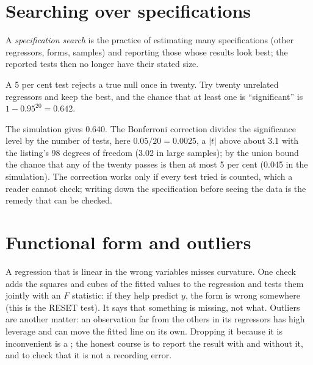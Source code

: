 \section{Searching over specifications}\label{sec:b2:specification:search}

\begin{definition}\label{def:b2:specification:spec-search}
A \emph{specification search} is the practice of estimating many specifications (other
regressors, forms, samples) and reporting those whose results look best; the reported tests then no longer have their
stated size.
\end{definition}

A 5 per cent test rejects a true null once in twenty. Try twenty unrelated regressors and keep the best, and the chance
that at least one is ``significant'' is $1 - 0.95^{20} = 0.642$.

\label{lst:b2:specification:search}

\label{out:b2:specification:search}

The simulation gives 0.640. The Bonferroni correction divides the significance level by the number of tests, here
$0.05/20 = 0.0025$, a $|t|$ above about 3.1 with the listing's 98 degrees of freedom (3.02 in large samples); by the union bound the chance that any of the twenty passes is then at most
5 per cent (0.045 in the simulation). The correction works only if every test tried is counted, which a reader cannot
check; writing down the specification before seeing the data is the remedy that can be checked.

\section{Functional form and outliers}\label{sec:b2:specification:form}

A regression that is linear in the wrong variables misses curvature. One check adds the squares and cubes of the fitted
values to the regression and tests them jointly with an $F$ statistic: if they help predict $y$, the form is wrong
somewhere (this is the RESET test). It says that something is missing, not what. Outliers are another matter: an
observation far from the others in its regressors has high leverage and can move the fitted line on its own. Dropping it
because it is inconvenient is a ; the honest course is to report the result with and without it, and
to check that it is not a recording error.

